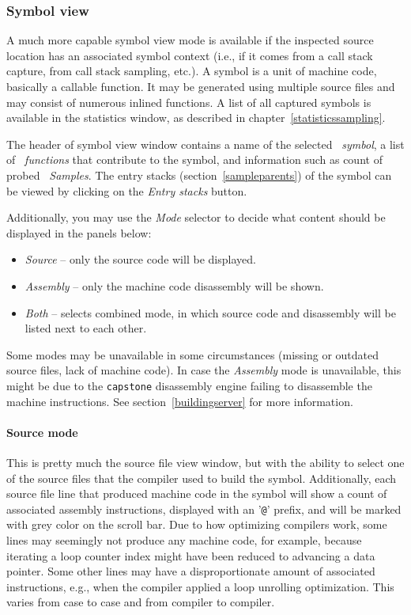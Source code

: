 \documentclass[hidelinks,titlepage,a4paper,twoside]{article}
\begin{document}
\subsubsection{Symbol view}
\label{symbolview}

A much more capable symbol view mode is available if the inspected source location has an associated symbol context (i.e., if it comes from a call stack capture, from call stack sampling, etc.). A symbol is a unit of machine code, basically a callable function. It may be generated using multiple source files and may consist of numerous inlined functions. A list of all captured symbols is available in the statistics window, as described in chapter~\ref{statisticssampling}.

The header of symbol view window contains a name of the selected \emph{\faPuzzlePiece{}~symbol}, a list of \emph{\faSitemap{}~functions} that contribute to the symbol, and information such as count of probed \emph{\faEyeDropper{}~Samples}. The entry stacks (section~\ref{sampleparents}) of the symbol can be viewed by clicking on the \emph{Entry stacks} button.

Additionally, you may use the \emph{Mode} selector to decide what content should be displayed in the panels below:

\begin{itemize}
\item \emph{Source} -- only the source code will be displayed.
\item \emph{Assembly} -- only the machine code disassembly will be shown.
\item \emph{Both} -- selects combined mode, in which source code and disassembly will be listed next to each other.
\end{itemize}

Some modes may be unavailable in some circumstances (missing or outdated source files, lack of machine code). In case the \emph{Assembly} mode is unavailable, this might be due to the \texttt{capstone} disassembly engine failing to disassemble the machine instructions. See section~\ref{buildingserver} for more information.

\paragraph{Source mode}

This is pretty much the source file view window, but with the ability to select one of the source files that the compiler used to build the symbol. Additionally, each source file line that produced machine code in the symbol will show a count of associated assembly instructions, displayed with an '\texttt{@}' prefix, and will be marked with grey color on the scroll bar. Due to how optimizing compilers work, some lines may seemingly not produce any machine code, for example, because iterating a loop counter index might have been reduced to advancing a data pointer. Some other lines may have a disproportionate amount of associated instructions, e.g., when the compiler applied a loop unrolling optimization. This varies from case to case and from compiler to compiler.
\end{document}
